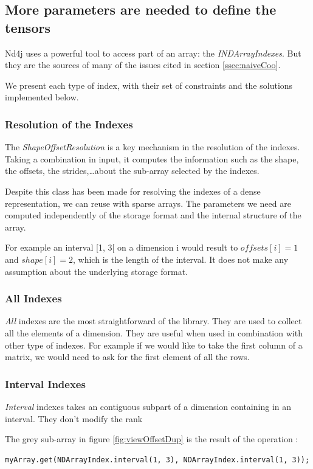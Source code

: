 \subsection{More parameters are needed to define the tensors}

Nd4j uses a powerful tool to access part of an array: the \textit{INDArrayIndexes}. But they are the sources of many of the issues cited in section \ref{ssec:naiveCoo}.

We present each type of index, with their set of constraints and the solutions implemented below.

\subsubsection{Resolution of the Indexes}

The \textit{ShapeOffsetResolution} is a key mechanism in the resolution of the indexes. Taking a combination in input, it computes the information such as the shape, the offsets, the strides,\dots about the sub-array selected by the indexes. 

Despite this class has been made for resolving the indexes of a dense representation, we can reuse with sparse arrays. The parameters we need are computed independently of the storage format and the internal structure of the array.

For example an interval [1, 3[ on a dimension i would result to $offsets[i] = 1$ and $shape[i] = 2$, which is the length of the interval. It does not make any assumption about the underlying storage format.

\subsubsection{All Indexes}
\textit{All} indexes are the most straightforward of the library. They are used to collect all the elements of a dimension. They are useful when used in combination with other type of indexes. For example if we would like to take the first column of a matrix, we would need to ask for the first element of all the rows.

\subsubsection{Interval Indexes}
\textit{Interval} indexes takes an contiguous subpart of a dimension containing in an interval. They don't modify the rank

The grey sub-array in figure \ref{fig:viewOffsetDup} is the result of the operation :
\begin{lstlisting}[style=nonumbers]
	myArray.get(NDArrayIndex.interval(1, 3), NDArrayIndex.interval(1, 3));
\end{lstlisting} 

